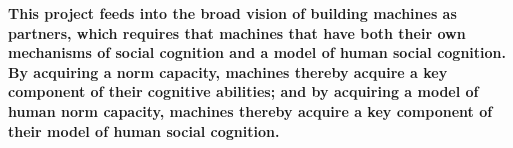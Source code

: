 \textbf{
This project feeds into the broad vision of building machines as
partners, which requires that machines that have both their own
mechanisms of social cognition and a model of human social cognition.
By acquiring a norm capacity, machines thereby acquire a key component
of their cognitive abilities; and by acquiring a model of human norm
capacity, machines thereby acquire a key component of their model of
human social cognition.}

